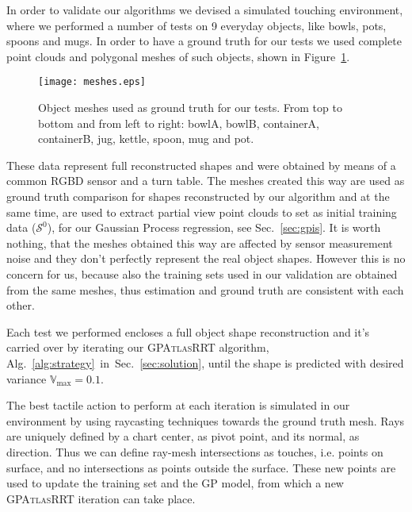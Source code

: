 
In order to validate our algorithms we devised a simulated touching environment,
where we performed a number of tests on 9 everyday objects, like bowls, pots, spoons and mugs.
In order to have a ground truth for our tests we used complete point clouds and polygonal meshes of
such objects, shown in Figure~\ref{fig:meshes}.

\begin{figure}[t]
    \centering
    \texttt{[image: meshes.eps]}
    \caption{Object meshes used as ground truth for our tests. From top to bottom and from left
    to right: bowlA, bowlB, containerA, containerB, jug, kettle, spoon, mug and pot.}
    \label{fig:meshes}
\end{figure}

These data represent full reconstructed shapes and were obtained by means of a common RGBD sensor and a turn table. The meshes created this way are used as ground truth comparison for shapes reconstructed by our algorithm and at the same time, are used to extract partial view point clouds to set as initial training data ($\mathcal{S}^0$), for our Gaussian Process regression, see Sec.~\ref{sec:gpis}.
It is worth nothing, that the meshes obtained this way are affected by sensor measurement noise 
and they don't perfectly represent the real object shapes. However this is no concern for us, because also the
training sets used in our validation are obtained from the same meshes, thus estimation and ground truth are
consistent with each other.

Each test we performed encloses a full object shape reconstruction and it's carried over
by iterating our \textsc{GPAtlasRRT} algorithm, Alg.~\ref{alg:strategy}~in~Sec.~\ref{sec:solution},
until the shape is predicted with desired variance $\mathbb{V}_{\max} = 0.1$.

The best tactile action to perform at each iteration is simulated in our
environment by using  raycasting techniques towards the ground truth mesh.
Rays are uniquely defined by a chart center, as pivot point, and its normal, as direction.
Thus we can define  ray-mesh intersections as touches, i.e. points on surface, and no intersections
as points outside the surface. These new points are used to update the training set
and the GP model, from which a new \textsc{GPAtlasRRT} iteration can take place. 

